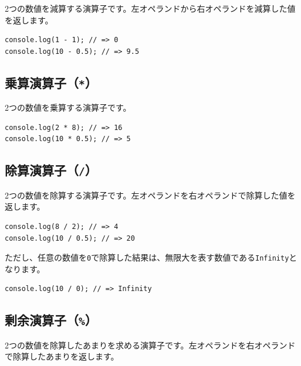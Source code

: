 2つの数値を減算する演算子です。左オペランドから右オペランドを減算した値を返します。

\begin{lstlisting}
console.log(1 - 1); // => 0
console.log(10 - 0.5); // => 9.5
\end{lstlisting}

\hypertarget{multiplication-operator}{%
\subsection{\texorpdfstring{乗算演算子（\texttt{*}）}{乗算演算子（*）}}\label{multiplication-operator}}

2つの数値を乗算する演算子です。

\begin{lstlisting}
console.log(2 * 8); // => 16
console.log(10 * 0.5); // => 5
\end{lstlisting}

\hypertarget{division-operator}{%
\subsection{\texorpdfstring{除算演算子（\texttt{/}）}{除算演算子（/）}}\label{division-operator}}

2つの数値を除算する演算子です。左オペランドを右オペランドで除算した値を返します。

\begin{lstlisting}
console.log(8 / 2); // => 4
console.log(10 / 0.5); // => 20
\end{lstlisting}

ただし、任意の数値を\texttt{0}で除算した結果は、無限大を表す数値である\texttt{Infinity}となります。

\begin{lstlisting}
console.log(10 / 0); // => Infinity
\end{lstlisting}

\hypertarget{modulus-operator}{%
\subsection{\texorpdfstring{剰余演算子（\texttt{\%}）}{剰余演算子（\%）}}\label{modulus-operator}}

2つの数値を除算したあまりを求める演算子です。左オペランドを右オペランドで除算したあまりを返します。


